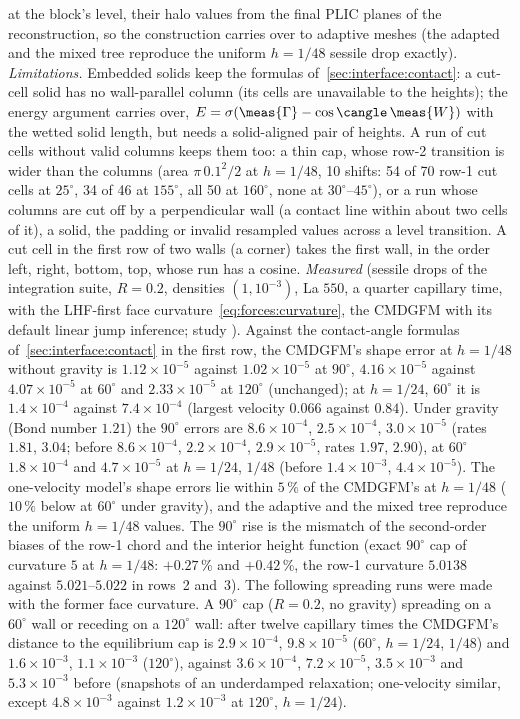 at the block's level, their halo values from the final PLIC planes of the
reconstruction, so the construction carries over to adaptive meshes (the
adapted and the mixed tree reproduce the uniform $h=1/48$ sessile drop
exactly).
\emph{Limitations.} Embedded solids keep the formulas
of~\cref{sec:interface:contact}: a cut-cell solid has no wall-parallel column
(its cells are unavailable to the heights); the energy argument carries over,
$E=\sigma(\meas{\Gamma}-\cos\cangle\,\meas{W})$ with the wetted solid length,
but needs a solid-aligned pair of heights. A run of cut cells without valid
columns keeps them too: a thin cap, whose row-2 transition is wider than
the columns (area $\pi\,0.1^2/2$ at $h=1/48$, 10 shifts: 54 of 70 row-1 cut
cells at $25^\circ$, 34 of 46 at $155^\circ$, all 50 at $160^\circ$, none at
$30^\circ$--$45^\circ$), or a run whose columns
are cut off by a perpendicular wall (a contact line within about two cells of
it), a solid, the padding or invalid resampled values across a level
transition. A cut cell in the
first row of two walls (a corner) takes the first wall, in the order left,
right, bottom, top, whose run has a cosine.
\emph{Measured} (sessile drops of the integration suite, $R=0.2$, densities
$(1,10^{-3})$, La $550$, a quarter capillary time, with the LHF-first face
curvature~\cref{eq:forces:curvature}, the CMDGFM with its default linear jump
inference; study
). Against the contact-angle formulas
of~\cref{sec:interface:contact} in the first row, the CMDGFM's shape error at
$h=1/48$ without gravity is $1.12\times10^{-5}$ against $1.02\times10^{-5}$ at
$90^\circ$, $4.16\times10^{-5}$ against $4.07\times10^{-5}$ at $60^\circ$ and
$2.33\times10^{-5}$ at $120^\circ$ (unchanged); at $h=1/24$, $60^\circ$ it is
$1.4\times10^{-4}$ against $7.4\times10^{-4}$ (largest velocity $0.066$ against
$0.84$). Under gravity (Bond number $1.21$) the $90^\circ$ errors are
$8.6\times10^{-4}$, $2.5\times10^{-4}$, $3.0\times10^{-5}$ (rates $1.81$, $3.04$;
before $8.6\times10^{-4}$, $2.2\times10^{-4}$, $2.9\times10^{-5}$, rates $1.97$,
$2.90$), at $60^\circ$ $1.8\times10^{-4}$ and $4.7\times10^{-5}$ at
$h=1/24$, $1/48$ (before $1.4\times10^{-3}$, $4.4\times10^{-5}$). The
one-velocity model's shape errors lie within $5\,\%$ of the CMDGFM's at
$h=1/48$ ($10\,\%$ below at $60^\circ$ under gravity), and the adaptive and
the mixed tree reproduce the uniform $h=1/48$
values. The
$90^\circ$ rise is the mismatch of the second-order biases of the row-1 chord
and the interior height function (exact $90^\circ$ cap of curvature $5$ at
$h=1/48$: $+0.27\,\%$ and $+0.42\,\%$, the row-1 curvature $5.0138$ against
$5.021$--$5.022$ in rows~2 and~3). The following spreading runs were made
with the former face curvature. A $90^\circ$ cap ($R=0.2$, no gravity)
spreading on a $60^\circ$ wall or receding on a $120^\circ$ wall: after twelve
capillary times the CMDGFM's distance to the equilibrium cap is
$2.9\times10^{-4}$, $9.8\times10^{-5}$ ($60^\circ$, $h=1/24$, $1/48$) and
$1.6\times10^{-3}$, $1.1\times10^{-3}$ ($120^\circ$), against
$3.6\times10^{-4}$, $7.2\times10^{-5}$, $3.5\times10^{-3}$ and $5.3\times10^{-3}$
before (snapshots of an underdamped relaxation; one-velocity similar, except
$4.8\times10^{-3}$ against $1.2\times10^{-3}$ at $120^\circ$, $h=1/24$).

